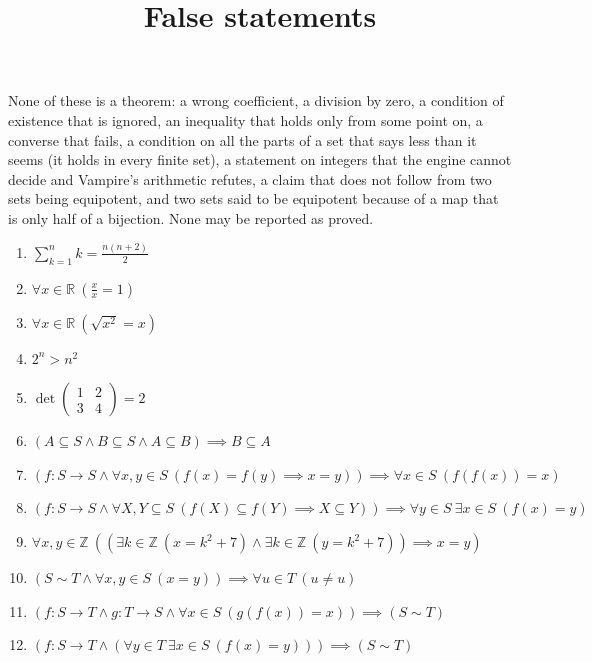 \documentclass{article}
\title{False statements}
\begin{document}
\maketitle
None of these is a theorem: a wrong coefficient, a division by zero, a
condition of existence that is ignored, an inequality that holds only from
some point on, a converse that fails, a condition on all the parts of a set
that says less than it seems (it holds in every finite set), a statement on
integers that the engine cannot decide and Vampire's arithmetic refutes, a
claim that does not follow from two sets being equipotent, and two sets said
to be equipotent because of a map that is only half of a bijection.
None may be reported as proved.
\begin{enumerate}
\item $\displaystyle \sum_{k=1}^{n} k = \frac{n(n+2)}{2}$
\item $\displaystyle \forall x \in \mathbb{R}\ \left(\frac{x}{x} = 1\right)$
\item $\displaystyle \forall x \in \mathbb{R}\ \left(\sqrt{x^{2}} = x\right)$
\item $\displaystyle 2^{n} > n^{2}$
\item $\displaystyle \det \begin{pmatrix} 1 & 2 \\ 3 & 4 \end{pmatrix} = 2$
\item $\displaystyle (A \subseteq S \land B \subseteq S \land A \subseteq B) \implies B \subseteq A$
\item $\displaystyle (f \colon S \to S \land \forall x, y \in S\ (f(x) = f(y) \implies x = y)) \implies \forall x \in S\ (f(f(x)) = x)$
\item $\displaystyle (f \colon S \to S \land \forall X, Y \subseteq S\ (f(X) \subseteq f(Y) \implies X \subseteq Y)) \implies \forall y \in S\ \exists x \in S\ (f(x) = y)$
\item $\displaystyle \forall x, y \in \mathbb{Z}\ ((\exists k \in \mathbb{Z}\ (x = k^{2} + 7) \land \exists k \in \mathbb{Z}\ (y = k^{2} + 7)) \implies x = y)$
\item $\displaystyle (S \sim T \land \forall x, y \in S\ (x = y)) \implies \forall u \in T\ (u \neq u)$
\item $\displaystyle (f \colon S \to T \land g \colon T \to S \land \forall x \in S\ (g(f(x)) = x)) \implies (S \sim T)$
\item $\displaystyle (f \colon S \to T \land (\forall y \in T\ \exists x \in S\ (f(x) = y))) \implies (S \sim T)$
\end{enumerate}
\end{document}
